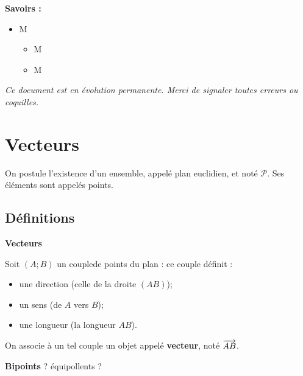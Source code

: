 \documentclass[10pt,oneside]{article}
\begin{document}
\begin{savoir}
\textbf{Savoirs :}
\begin{itemize}
\item M
\begin{itemize}
\item M
\item M
\end{itemize}
\end{itemize}
\end{savoir}

\setlength{\parskip}{0ex plus 0.2ex minus 0ex}
 \renewcommand{\contentsname}{}
 \renewcommand{\baselinestretch}{1}

\textit{Ce document est en évolution permanente. Merci de signaler toutes
erreurs ou coquilles.}

\tableofcontents

 \renewcommand{\baselinestretch}{1.2}
\setlength{\parskip}{2ex plus 0.5ex minus 0.2ex}



\section{Vecteurs}
On postule l'existence d'un ensemble, appelé plan euclidien, et noté $\mathcal{P}$. Ses éléments sont appelés points.
\subsection{Définitions}
\begin{defi}
\textbf{Vecteurs}

Soit $(A;B)$ un couple\footnotemark[1] de points du plan : ce couple définit :
\begin{itemize}
\item une direction (celle de la droite $(AB)$);
\item un sens (de $A$ vers $B$);
\item une longueur (la longueur $AB$).
\end{itemize}

On associe à un tel couple un objet appelé \textbf{vecteur}, noté $\overrightarrow{AB}$.
\end{defi}


\begin{defi}
\textbf{Bipoints}
? équipollents ?
\end{defi}
\end{document}
